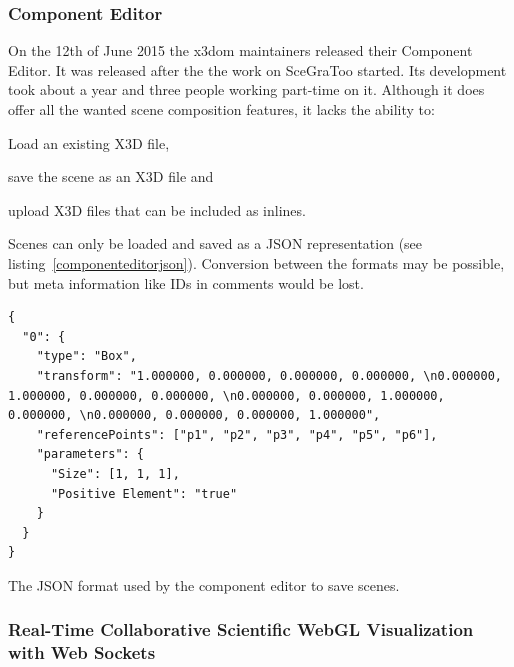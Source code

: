 \clearpage

\subsubsection{Component Editor}
\label{component-editor30}

On the 12th of June 2015 the x3dom maintainers released their Component Editor. \cite{componenteditor}
It was released after the the work on \gls{SceGraToo} started.
Its development took about a year and three people working part-time on it. \cite{componenteditoreffort}
Although it does offer all the wanted scene composition features, it lacks the ability to:

\begin{itemize*}
  \item Load an existing \gls{X3D} file,
  \item save the scene as an \gls{X3D} file and
  \item upload \gls{X3D} files that can be included as inlines.
\end{itemize*}

Scenes can only be loaded and saved as a \gls{JSON} representation (see listing~\ref{componenteditorjson}).
Conversion between the formats may be possible, but meta information like \glspl{ID} in comments would be lost.

\begin{listing}
  \begin{verbatim}
{
  "0": {
    "type": "Box",
    "transform": "1.000000, 0.000000, 0.000000, 0.000000, \n0.000000, 1.000000, 0.000000, 0.000000, \n0.000000, 0.000000, 1.000000, 0.000000, \n0.000000, 0.000000, 0.000000, 1.000000",
    "referencePoints": ["p1", "p2", "p3", "p4", "p5", "p6"],
    "parameters": {
      "Size": [1, 1, 1],
      "Positive Element": "true"
    }
  }
}
  \end{verbatim}
  \caption{The \gls{JSON} format used by the component editor to save scenes.}
  \label{componenteditorjson}
\end{listing}

\subsubsection{Real-Time Collaborative Scientific WebGL Visualization with Web Sockets}
\label{rtcswvwws}


